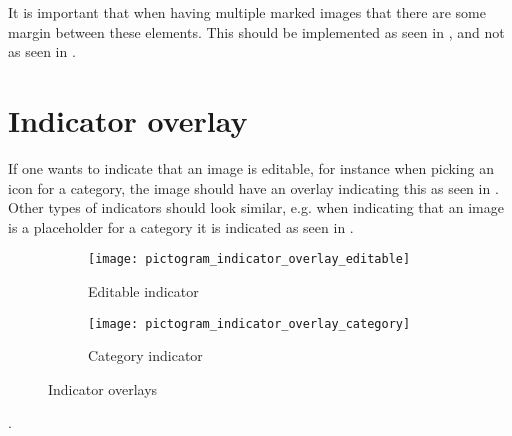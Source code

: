 \begin{note}
	It is important that when having multiple marked images that there are some margin between these elements. This should be implemented as seen in , and not as seen in .
\end{note} 

\section{Indicator overlay}
\label{sec:indicator_overlay}

If one wants to indicate that an image is editable, for instance when picking an icon for a category, the image should have an overlay indicating this as seen in . Other types of indicators should look similar, e.g. when indicating that an image is a placeholder for a category it is indicated as seen in .

\begin{figure}[!htbp]
    \centering

    \begin{subfigure}[t]{0.4\textwidth}
        \centering
        \texttt{[image: pictogram\_indicator\_overlay\_editable]}
        \caption{Editable indicator}
        \label{fig:pictogram_indicator_overlay_editable}
    \end{subfigure}
    \hspace{5em} 
    \begin{subfigure}[t]{0.4\textwidth}
        \centering
        \texttt{[image: pictogram\_indicator\_overlay\_category]}
        \caption{Category indicator}
        \label{fig:pictogram_indicator_overlay_category}
    \end{subfigure}
    
    \caption{Indicator overlays}
    \label{fig:pictograms_marked}
\end{figure}

.
